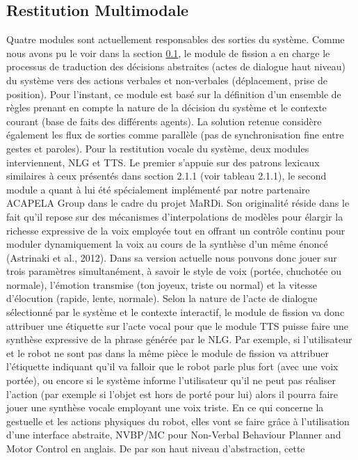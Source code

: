 \documentclass[a4paper,11pt,twoside]{StyleThese}
\begin{document}
\subsection{Restitution Multimodale}
Quatre modules sont actuellement responsables
des sorties du système.
Comme nous avons pu le voir dans la section \ref{},
le module de fission a en charge
le processus de traduction des décisions abstraites (actes de dialogue haut niveau) du système vers des actions verbales et non-verbales (déplacement, prise de position).
Pour l’instant, ce module est basé sur la définition d’un ensemble de règles prenant
en compte la nature de la décision du système et le contexte courant (base de faits des
différents agents). La solution retenue considère également les flux de sorties comme
parallèle (pas de synchronisation fine entre gestes et paroles).
Pour la restitution vocale du système, deux modules interviennent, NLG et TTS. Le
premier s’appuie sur des patrons lexicaux similaires à ceux présentés dans section 2.1.1
(voir tableau 2.1.1), le second module a quant à lui été spécialement implémenté par
notre partenaire ACAPELA Group dans le cadre du projet MaRDi. Son originalité réside
dans le fait qu’il repose sur des mécanismes d’interpolations de modèles pour élargir la
richesse expressive de la voix employée tout en offrant un contrôle continu pour moduler
dynamiquement la voix au cours de la synthèse d’un même énoncé (Astrinaki et al.,
2012). Dans sa version actuelle nous pouvons donc jouer sur trois paramètres simultanément,
à savoir le style de voix (portée, chuchotée ou normale), l’émotion transmise
(ton joyeux, triste ou normal) et la vitesse d’élocution (rapide, lente, normale).
Selon la nature de l’acte de dialogue sélectionné par le système et le contexte interactif,
le module de fission va donc attribuer une étiquette sur l’acte vocal pour que le
module TTS puisse faire une synthèse expressive de la phrase générée par le NLG. Par
exemple, si l’utilisateur et le robot ne sont pas dans la même pièce le module de fission
va attribuer l’étiquette indiquant qu’il va falloir que le robot parle plus fort (avec
une voix portée), ou encore si le système informe l’utilisateur qu’il ne peut pas réaliser
l’action (par exemple si l’objet est hors de porté pour lui) alors il pourra faire jouer une
synthèse vocale employant une voix triste.
En ce qui concerne la gestuelle et les actions physiques du robot, elles vont se
faire grâce à l’utilisation d’une interface abstraite, NVBP/MC pour Non-Verbal Behaviour
Planner and Motor Control en anglais. De par son haut niveau d’abstraction, cette
\end{document}
